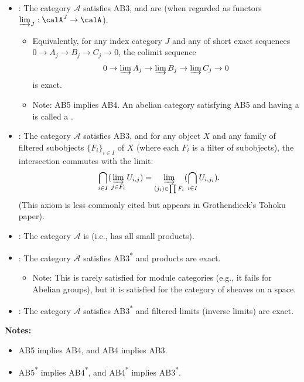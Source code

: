 \begin{definition}
\begin{itemize}
  \item {}: The category $\mathcal{A}$ satisfies AB3, and  are  (when regarded as functors $\varinjlim_J: \calA^J \to \calA$).
  \begin{itemize}
    \item Equivalently, for any  index category $J$ and any  of short exact sequences $0 \to A_j \to B_j \to C_j \to 0$, the colimit sequence
    \[ 0 \to \varinjlim A_j \to \varinjlim B_j \to \varinjlim C_j \to 0 \]
    is exact.
    \item Note: AB5 implies AB4. An abelian category satisfying AB5 and having a  is called a .
  \end{itemize}
  
  \item {}: The category $\mathcal{A}$ satisfies AB3, and for any object $X$ and any family of filtered subobjects $\{F_i\}_{i \in I}$ of $X$ (where each $F_i$ is a filter of subobjects), the intersection commutes with the limit:
  \[ \bigcap_{i \in I} (\varinjlim_{j \in F_i} U_{i,j}) = \varinjlim_{(j_i) \in \prod F_i} (\bigcap_{i \in I} U_{i, j_i}). \]
  (This axiom is less commonly cited but appears in Grothendieck's Tohoku paper).

  \item {}: The category \(\mathcal{A}\) is  (i.e., has all small products).

  \item {}: The category \(\mathcal{A}\) satisfies AB3\textsuperscript{*} and products are exact.
  \begin{itemize}
    \item Note: This is rarely satisfied for module categories (e.g., it fails for Abelian groups), but it is satisfied for the category of sheaves on a space.
  \end{itemize}

  \item {}: The category \(\mathcal{A}\) satisfies AB3\textsuperscript{*} and filtered limits (inverse limits) are exact.
\end{itemize}

\textbf{Notes:}
\begin{itemize}
  \item AB5 implies AB4, and AB4 implies AB3.
  \item AB5\textsuperscript{*} implies AB4\textsuperscript{*}, and AB4\textsuperscript{*} implies AB3\textsuperscript{*}.
\end{itemize}
\end{definition}

